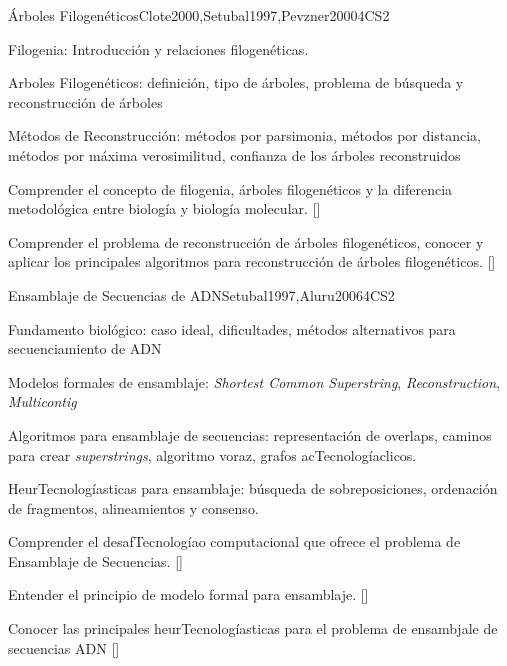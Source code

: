 \begin{syllabus}
\begin{unit}{Árboles Filogenéticos}{}{Clote2000,Setubal1997,Pevzner2000}{4}{CS2}
\begin{topics}
    \item Filogenia: Introducción y relaciones filogenéticas.
    \item Arboles Filogenéticos: definición, tipo de árboles, problema de búsqueda y reconstrucción de árboles
    \item Métodos de Reconstrucción: métodos por parsimonia, métodos por distancia, métodos por máxima verosimilitud, confianza de los árboles reconstruidos
\end{topics}

\begin{learningoutcomes}
    \item  Comprender el concepto de filogenia, árboles filogenéticos y la diferencia metodológica entre biología y biología molecular. [\Familiarity]
    \item Comprender el problema de reconstrucción de árboles filogenéticos, conocer y aplicar los principales algoritmos para reconstrucción de árboles filogenéticos. [\Assessment]
\end{learningoutcomes}
\end{unit}

\begin{unit}{Ensamblaje de Secuencias de ADN}{}{Setubal1997,Aluru2006}{4}{CS2}
\begin{topics}
    \item Fundamento biológico: caso ideal, dificultades, métodos alternativos para secuenciamiento de ADN
    \item Modelos formales de ensamblaje: \textit{Shortest Common Superstring}, \textit{Reconstruction}, \textit{Multicontig}
    \item Algoritmos para ensamblaje de secuencias: representación de overlaps, caminos para crear \textit{superstrings}, algoritmo voraz, grafos acTecnologíaclicos.
    \item HeurTecnologíasticas para ensamblaje: búsqueda de sobreposiciones, ordenación de fragmentos, alineamientos y consenso.
\end{topics}

\begin{learningoutcomes}
    \item Comprender el desafTecnologíao computacional que ofrece el problema de Ensamblaje de Secuencias. [\Familiarity]
    \item Entender el principio de modelo formal para ensamblaje. [\Assessment]
    \item Conocer las principales heurTecnologíasticas para el problema de ensambjale de secuencias ADN [\Usage]
\end{learningoutcomes}
\end{unit}


\end{syllabus}
